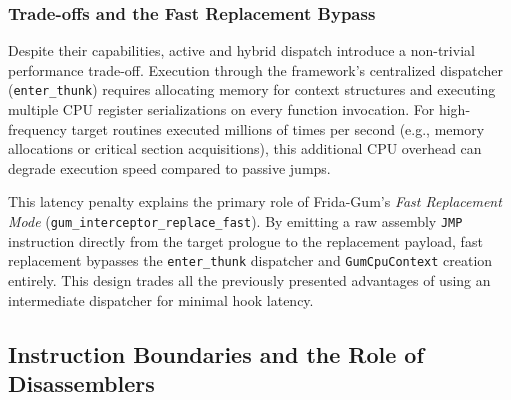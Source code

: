 \subsubsection{Trade-offs and the Fast Replacement Bypass}

Despite their capabilities, active and hybrid dispatch introduce a non-trivial performance trade-off. Execution through the framework's centralized dispatcher (\texttt{enter\_thunk}) requires allocating memory for context structures and executing multiple CPU register serializations on every function invocation. For high-frequency target routines executed millions of times per second (e.g., memory allocations or critical section acquisitions), this additional CPU overhead can degrade execution speed compared to  passive jumps.

This latency penalty explains the primary role of Frida-Gum's \emph{Fast Replacement Mode} (\texttt{gum\_interceptor\_replace\_fast}). By emitting a raw assembly \texttt{JMP} instruction directly from the target prologue to the replacement payload, fast replacement bypasses the \texttt{enter\_thunk} dispatcher and \texttt{GumCpuContext} creation entirely. This design trades all the previously presented advantages of using an intermediate dispatcher for minimal hook latency.

\subsection{Instruction Boundaries and the Role of Disassemblers}

